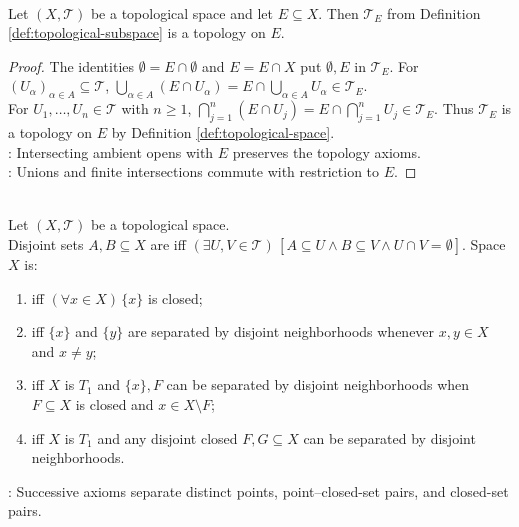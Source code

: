 \begin{proposition} \label{prop:subspace-collection-is-topology} \\
Let $(X,\mathcal{T})$ be a topological space and let $E\subseteq X$. Then $\mathcal{T}_E$ from Definition \ref{def:topological-subspace} is a topology on $E$.
\begin{proof}
The identities $\emptyset=E\cap\emptyset$ and $E=E\cap X$ put $\emptyset,E$ in $\mathcal{T}_E$. For $(U_\alpha)_{\alpha\in A}\subseteq\mathcal{T}$, $\bigcup\limits_{\alpha\in A}(E\cap U_\alpha)=E\cap\bigcup\limits_{\alpha\in A}U_\alpha\in\mathcal{T}_E$.\\
For $U_1,\ldots,U_n\in\mathcal{T}$ with $n\geq1$, $\bigcap\limits_{j=1}^n(E\cap U_j)=E\cap\bigcap\limits_{j=1}^nU_j\in\mathcal{T}_E$. Thus $\mathcal{T}_E$ is a topology on $E$ by Definition \ref{def:topological-space}.\\
: Intersecting ambient opens with $E$ preserves the topology axioms.\\
: Unions and finite intersections commute with restriction to $E$.
\end{proof}
\end{proposition}

\begin{definition} \label{def:separation-axioms} \\
Let $(X,\mathcal{T})$ be a topological space.\\
Disjoint sets $A,B\subseteq X$ are  iff $(\exists U,V\in\mathcal{T})\,[A\subseteq U\land B\subseteq V\land U\cap V=\emptyset]$. Space $X$ is:
\begin{enumerate}[label=(\roman*)]
\setlength{\itemsep}{0pt}
\item {} iff $(\forall x\in X)\,\{x\}$ is closed;
\item {} iff $\{x\}$ and $\{y\}$ are separated by disjoint neighborhoods whenever $x,y\in X$ and $x\neq y$;
\item {} iff $X$ is $T_1$ and $\{x\},F$ can be separated by disjoint neighborhoods when $F\subseteq X$ is closed and $x\in X\setminus F$;
\item {} iff $X$ is $T_1$ and any disjoint closed $F,G\subseteq X$ can be separated by disjoint neighborhoods.
\end{enumerate}
: Successive axioms separate distinct points, point--closed-set pairs, and closed-set pairs.
\end{definition}

